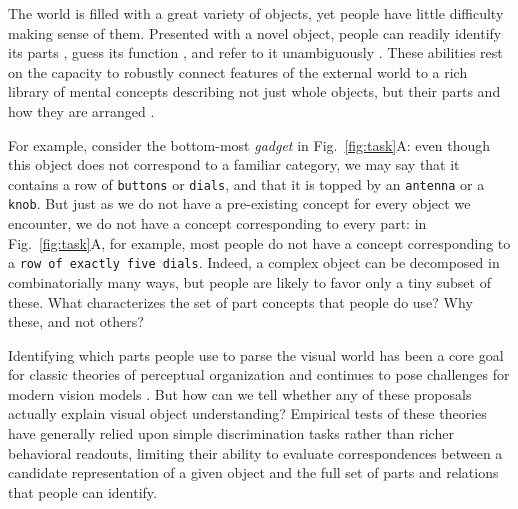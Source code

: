 \noindent The world is filled with a great variety of objects, yet people have little difficulty making sense of them. 
Presented with a novel object, people can readily identify its parts , guess its function , and refer to it unambiguously . 
These abilities rest on the capacity to robustly connect features of the external world to a rich library of mental concepts describing not just whole objects, but their parts and how they are arranged . 

For example, consider the bottom-most \emph{gadget} in Fig.~\ref{fig:task}A: even though this object does not correspond to a familiar category, we may say that it contains a row of \texttt{buttons} or \texttt{dials}, and that it is topped by an \texttt{antenna} or a \texttt{knob}.
But just as we do not have a pre-existing concept for every object we encounter, we do not have a concept corresponding to every part: in Fig.~\ref{fig:task}A, for example, most people do not have a concept corresponding to a \texttt{row of exactly five dials}. %
Indeed, a complex object can be decomposed in combinatorially many ways, but people are likely to favor only a tiny subset of these.
What characterizes the set of part concepts that people do use? Why these, and not others?

Identifying which parts people use to parse the visual world has been a core goal for classic theories of perceptual organization  and continues to pose challenges for modern vision models .
But how can we tell whether any of these proposals actually explain visual object understanding? 
Empirical tests of these theories have generally relied upon simple discrimination tasks rather than richer behavioral readouts, limiting their ability to evaluate correspondences between a candidate representation of a given object and the full set of parts and relations that people can identify.

